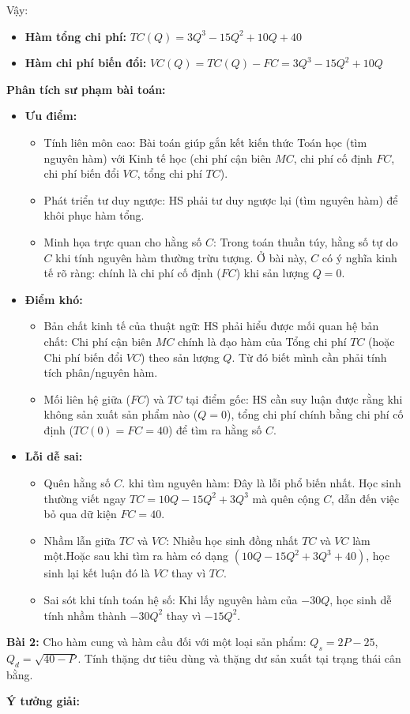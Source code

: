 \documentclass[12pt,a4paper,oneside]{book}
\theoremstyle{theorem}
\theoremstyle{definition}
\begin{document}
\noindent Vậy:
\begin{itemize}
    \item \textbf{Hàm tổng chi phí:} 
    $
    TC(Q) = 3Q^3 - 15Q^2 + 10Q + 40
    $
    \item \textbf{Hàm chi phí biến đổi:} 
    $
    VC(Q) = TC(Q) - FC = 3Q^3 - 15Q^2 + 10Q
    $
\end{itemize}
\textbf{Phân tích sư phạm bài toán:}
\begin{itemize}
    \item \textbf{Ưu điểm:} 
    \begin{itemize}
        \item Tính liên môn cao: Bài toán giúp gắn kết kiến thức Toán học (tìm nguyên hàm) với Kinh tế học (chi phí cận biên $MC$, chi phí cố định $FC$, chi phí biến đổi $VC$, tổng chi phí $TC$).
        \item Phát triển tư duy ngược: HS phải tư duy ngược lại (tìm nguyên hàm) để khôi phục hàm tổng.
        \item Minh họa trực quan cho hằng số $C$: Trong toán thuần túy, hằng số tự do $C$ khi tính nguyên hàm thường trừu tượng. Ở bài này, $C$ có ý nghĩa kinh tế rõ ràng: chính là chi phí cố định ($FC$) khi sản lượng $Q = 0$.
    \end{itemize}
    \item \textbf{Điểm khó:}
    \begin{itemize}
        \item Bản chất kinh tế của thuật ngữ: HS phải hiểu được mối quan hệ bản chất: Chi phí cận biên $MC$ chính là đạo hàm của Tổng chi phí $TC$ (hoặc Chi phí biến đổi  $VC$) theo sản lượng $Q$. Từ đó biết mình cần phải tính tích phân/nguyên hàm.
        \item Mối liên hệ giữa ($FC$) và $TC$ tại điểm gốc: HS cần suy luận được rằng khi không sản xuất sản phẩm nào ($Q = 0$), tổng chi phí chính bằng chi phí cố định ($TC(0) = FC = 40$) để tìm ra hằng số $C$.
    \end{itemize}
    \item \textbf{Lỗi dễ sai:}
    \begin{itemize}
        \item Quên hằng số $C$. khi tìm nguyên hàm: Đây là lỗi phổ biến nhất. Học sinh thường viết ngay $TC = 10Q - 15Q^2 + 3Q^3$ mà quên cộng $C$, dẫn đến việc bỏ qua dữ kiện $FC = 40$.
        \item Nhầm lẫn giữa $TC$ và $VC$:
        Nhiều học sinh đồng nhất $TC$ và $VC$ làm một.Hoặc sau khi tìm ra hàm có dạng $(10Q - 15Q^2 + 3Q^3 + 40)$, học sinh lại kết luận đó là $VC$ thay vì $TC$.
        \item Sai sót khi tính toán hệ số: Khi lấy nguyên hàm của $-30Q$, học sinh dễ tính nhầm thành $-30Q^{2}$ thay vì $-15Q^{2}$.
    \end{itemize}
    \end{itemize}
\noindent\textbf{Bài 2:} Cho hàm cung và hàm cầu đối với một loại sản phẩm: $Q_s = 2P - 25$, $Q_d = \sqrt{40 - P}$. Tính thặng dư tiêu dùng và thặng dư sản xuất tại trạng thái cân bằng.
\begin{center}
    \textbf{Ý tưởng giải:}
\end{center}
\end{document}

